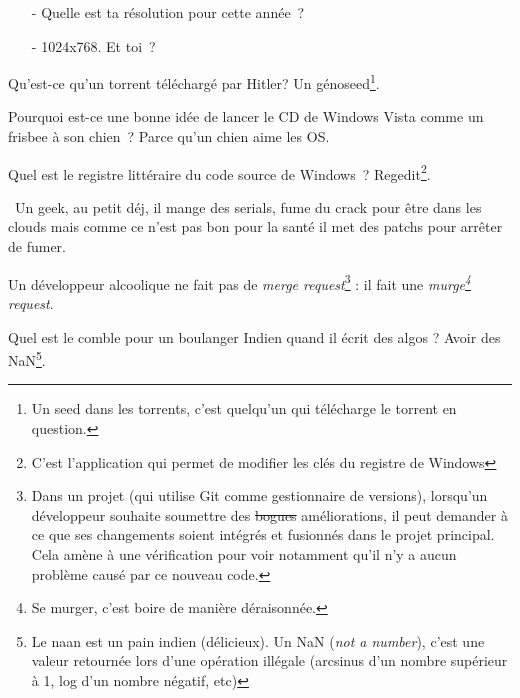 \documentclass[10pt,a5paper,fullpage]{book}
\begin{document}
\begin{enumerate}
{		\begin{itemize}
			\item[-] Quelle est ta résolution pour cette année~?
			\item[-] 1024x768. Et toi~?
		\end{itemize}
		\item Qu'est-ce qu'un torrent téléchargé par Hitler? Un génoseed\footnote{Un seed dans les torrents, c’est quelqu’un qui télécharge le torrent en question.}.
		\item Pourquoi est-ce une bonne idée de lancer le CD de Windows Vista comme un frisbee à son chien~? Parce qu’un chien aime les OS.
		\item Quel est le registre littéraire du code source de Windows~? Regedit\footnote{C'est l'application qui permet de modifier les clés du registre de Windows}.
		\item \guillemotleft~Un geek, au petit déj, il mange des serials, fume du crack pour être dans les clouds mais comme ce n’est pas bon pour la santé il met des patchs pour arrêter de fumer.~
		\item Un développeur alcoolique ne fait pas de \textit{merge request}\footnote{Dans un projet (qui utilise Git comme gestionnaire de versions), lorsqu'un développeur souhaite soumettre des \sout{bogues} améliorations, il peut demander à ce que ses changements soient intégrés et fusionnés dans le projet principal. Cela amène à une vérification pour voir notamment qu'il n'y a aucun problème causé par ce nouveau code.} : il fait une \textit{murge\footnote{Se murger, c'est boire de manière déraisonnée.} request}.
		\item Quel est le comble pour un boulanger Indien quand il écrit des algos ? Avoir des NaN\footnote{Le naan est un pain indien (délicieux). Un NaN (\textit{not a number}), c'est une valeur retournée lors d'une opération illégale (arcsinus d'un nombre supérieur à 1, log d'un nombre négatif, etc)}.
		}
	\end{enumerate}
	
\end{document}
